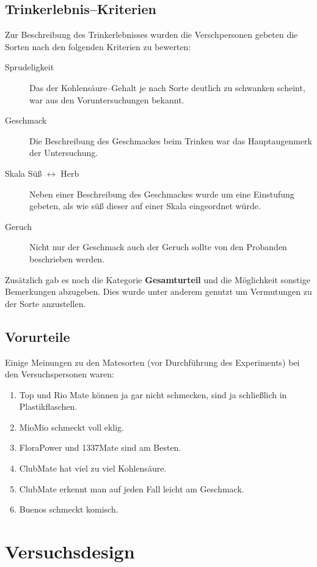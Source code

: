 \documentclass[11pt,a4paper,ngerman]{article}
\begin{document}
\subsection{Trinkerlebnis--Kriterien}
Zur Beschreibung des Trinkerlebnisses wurden die Verschpersonen gebeten die Sorten nach den folgenden Kriterien zu bewerten:
\begin{description}
 \item[Sprudeligkeit] 
    Das der Kohlensäure--Gehalt je nach Sorte deutlich zu schwanken scheint, war aus den Voruntersuchungen bekannt.

 \item[Geschmack] Die Beschreibung des Geschmackes beim Trinken war das Hauptaugenmerk der Untersuchung.

 \item[Skala Süß  $\leftrightarrow$ Herb] Neben einer Beschreibung des Geschmackes wurde um eine Einstufung gebeten, als wie süß dieser auf einer Skala eingeordnet würde.

 \item[Geruch] Nicht nur der Geschmack auch der Geruch sollte von den Probanden beschrieben werden.
\end{description}
  Zusätzlich gab es noch die Kategorie \textbf{Gesamturteil} und die Möglichkeit sonstige Bemerkungen abzugeben. Dies wurde unter anderem genutzt um Vermutungen zu der Sorte anzustellen.

\subsection{Vorurteile}
Einige Meinungen zu den Matesorten (vor Durchführung des Experiments) bei den Versuchspersonen waren:
\begin{enumerate}
 \item Top und Rio Mate können ja gar nicht schmecken, sind ja schließlich in Plastikflaschen.
 \item MioMio schmeckt voll eklig.
 \item FloraPower und 1337Mate sind am Besten.
 \item ClubMate hat viel zu viel Kohlensäure.
 \item ClubMate erkennt man auf jeden Fall leicht am Geschmack.
 \item Buenos schmeckt komisch.
\end{enumerate}


\section{Versuchsdesign}
\end{document}
